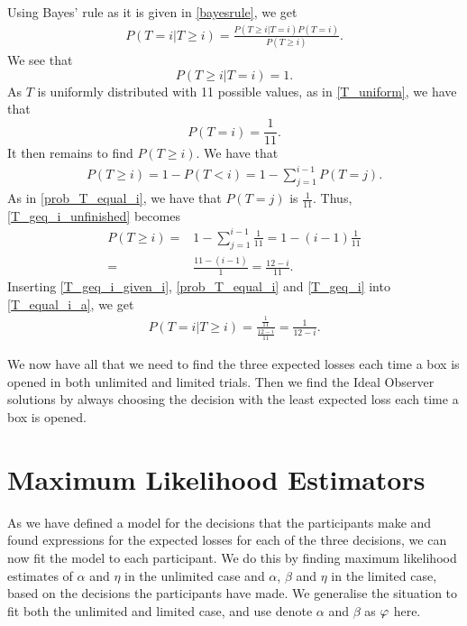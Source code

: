 Using Bayes' rule as it is given in \eqref{bayesrule}, we get
\begin{equation}
\label{T_equal_i_a}
    \begin{aligned}
        P(T=i|T\geq i) = \frac{P(T\geq i|T=i)P(T=i)}{P(T\geq i)}.
    \end{aligned}
\end{equation}
We see that 
\begin{equation}
\label{T_geq_i_given_i}
    P(T\geq i|T=i) = 1.
\end{equation}
As $T$ is uniformly distributed with 11 possible values, as in \eqref{T_uniform}, we have that
\begin{equation}
\label{prob_T_equal_i}
    P(T=i) = \frac{1}{11}.
\end{equation}
It then remains to find $P(T\geq i)$. We have that
\begin{equation}
\label{T_geq_i_unfinished}
    \begin{aligned}
        P(T\geq i) = 1 - P(T<i) = 1 - \sum_{j=1}^{i-1}P(T=j).
    \end{aligned}
\end{equation}
As in \eqref{prob_T_equal_i}, we have that $P(T=j)$ is $\frac{1}{11}$. Thus, \eqref{T_geq_i_unfinished} becomes
\begin{equation}
\label{T_geq_i}
    \begin{aligned}
        P(T\geq i) =& 1-\sum_{j=1}^{i-1} \frac{1}{11} = 1- (i-1)\frac{1}{11}\\[6pt]
        =& \frac{11-(i-1)}{1} = \frac{12-i}{11}.
    \end{aligned}
\end{equation}
Inserting \eqref{T_geq_i_given_i}, \eqref{prob_T_equal_i} and \eqref{T_geq_i} into \eqref{T_equal_i_a}, we get 
\begin{equation}
    \begin{aligned}
        P(T=i|T\geq i) = \frac{\frac{1}{11}}{\frac{12-i}{11}} = \frac{1}{12-i}.
    \end{aligned}
\end{equation}

We now have all that we need to find the three expected losses each time a box is opened in both unlimited and limited trials. Then we find the Ideal Observer solutions by always choosing the decision with the least expected loss each time a box is opened. 



\section{Maximum Likelihood Estimators}
\label{section:mles}
As we have defined a model for the decisions that the participants make and found expressions for the expected losses for each of the three decisions, we can now fit the model to each participant. We do this by finding maximum likelihood estimates of $\alpha$ and $\eta$ in the unlimited case and $\alpha$, $\beta$ and $\eta$ in the limited case, based on the decisions the participants have made. We generalise the situation to fit both the unlimited and limited case, and use denote $\alpha$ and $\beta$ as $\varphi$ here. 

